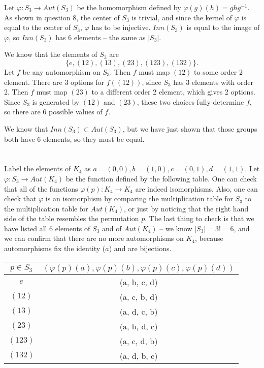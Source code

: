 \documentclass[12pt]{article}
\begin{document}
Let $\varphi: S_3 \rightarrow Aut(S_3)$ be the homomorphism defined by $\varphi(g)(h) = ghg^{-1}$. As shown in question 8, the center of $S_3$ is trivial, and since the kernel of $\varphi$ is equal to the center of $S_3$, $\varphi$ has to be injective. $Inn(S_3)$ is equal to the image of $\varphi$, so $Inn(S_3)$ has 6 elements -- the same as $|S_3|$.
\par
We know that the elements of $S_3$ are
\[ \{ e, (12), (13), (23), (123), (132) \}. \]
Let $f$ be any automorphism on $S_3$. Then $f$ must map $(12)$ to some order 2 element. There are 3 options for $f((12))$, since $S_3$ has 3 elements with order 2. Then $f$ must map $(23)$ to a different order 2 element, which gives 2 options. Since $S_3$ is generated by $(12)$ and $(23)$, these two choices fully determine $f$, so there are 6 possible values of $f$.
\par
We know that $Inn(S_3) \subset Aut(S_3)$, but we have just shown that those groups both have 6 elements, so they must be equal.

\section{}
\noindent{}\bigskip

Label the elements of $K_4$ as $a=(0,0), b=(1,0), c=(0,1), d=(1,1)$. Let $\varphi: S_3 \rightarrow Aut(K_4)$ be the function defined by the following table. One can check that all of the functions $\varphi(p): K_4 \rightarrow K_4$ are indeed isomorphisms. Also, one can check that $\varphi$ is an isomorphism by comparing the multiplication table for $S_3$ to the multiplication table for $Aut(K_4)$, or just by noticing that the right hand side of the table resembles the permutation $p$. The last thing to check is that we have listed all 6 elements of $S_3$ and of $Aut(K_4)$ -- we know $|S_3| = 3! = 6$, and we can confirm that there are no more automorphisms on $K_4$, because automorphisms fix the identity ($a$) and are bijections.
\bigskip
\par
{\centering
\begin{tabular}{|c|c|}
    \hline
    $p \in S_3$ & $(\varphi(p)(a), \varphi(p)(b), \varphi(p)(c), \varphi(p)(d))$ \\
    \hline
    \hline
    $e$ & (a, b, c, d) \\
    $(12)$ & (a, c, b, d) \\
    $(13)$ & (a, d, c, b) \\
    $(23)$ & (a, b, d, c) \\
    $(123)$ & (a, c, d, b) \\
    $(132)$ & (a, d, b, c) \\
    \hline
\end{tabular}\par}
\end{document}
